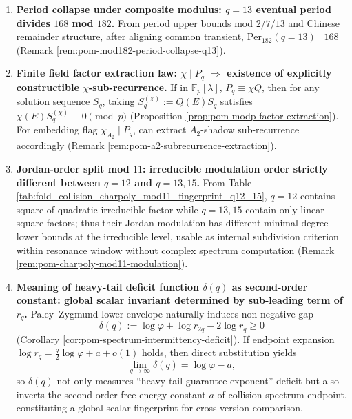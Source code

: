 \begin{enumerate}
  \item \textbf{Period collapse under composite modulus: \texorpdfstring{$q=13$}{q=13} eventual period divides \texorpdfstring{$168$}{168} mod \texorpdfstring{$182$}{182}.}
  From period upper bounds mod \(2/7/13\) and Chinese remainder structure, after aligning common transient, \(\mathrm{Per}_{182}(q=13)\mid 168\) (Remark \ref{rem:pom-mod182-period-collapse-q13}).

  \item \textbf{Finite field factor extraction law: \texorpdfstring{$\chi\mid P_q$}{chi|Pq} \texorpdfstring{$\Rightarrow$}{=>} existence of explicitly constructible \texorpdfstring{$\chi$}{chi}-sub-recurrence.}
  If in \(\mathbb{F}_p[\lambda]\), \(P_q\equiv \chi Q\), then for any solution sequence \(S_q\), taking \(S_q^{(\chi)}:=Q(E)S_q\) satisfies \(\chi(E)S_q^{(\chi)}\equiv 0\pmod p\) (Proposition \ref{prop:pom-modp-factor-extraction}).
  For embedding flag \(\chi_{A_2}\mid P_q\), can extract \(A_2\)-shadow sub-recurrence accordingly (Remark \ref{rem:pom-a2-subrecurrence-extraction}).

  \item \textbf{Jordan-order split mod \texorpdfstring{$11$}{11}: irreducible modulation order strictly different between \texorpdfstring{$q=12$}{q=12} and \texorpdfstring{$q=13,15$}{q=13,15}.}
  From Table \ref{tab:fold_collision_charpoly_mod11_fingerprint_q12_15}, \(q=12\) contains square of quadratic irreducible factor while \(q=13,15\) contain only linear square factors; thus their Jordan modulation has different minimal degree lower bounds at the irreducible level, usable as internal subdivision criterion within resonance window without complex spectrum computation (Remark \ref{rem:pom-charpoly-mod11-modulation}).

  \item \textbf{Meaning of heavy-tail deficit function \texorpdfstring{$\delta(q)$}{delta(q)} as second-order constant: global scalar invariant determined by sub-leading term of \texorpdfstring{$r_q$}{rq}.}
  Paley--Zygmund lower envelope naturally induces non-negative gap
  \[
  \delta(q):=\log\varphi+\log r_{2q}-2\log r_q\ge 0
  \]
  (Corollary \ref{cor:pom-spectrum-intermittency-deficit}).
  If endpoint expansion \(\log r_q=\frac{q}{2}\log\varphi+a+o(1)\) holds, then direct substitution yields
  \[
  \lim_{q\to\infty}\delta(q)=\log\varphi-a,
  \]
  so \(\delta(q)\) not only measures ``heavy-tail guarantee exponent'' deficit but also inverts the second-order free energy constant \(a\) of collision spectrum endpoint, constituting a global scalar fingerprint for cross-version comparison.


\end{enumerate}
